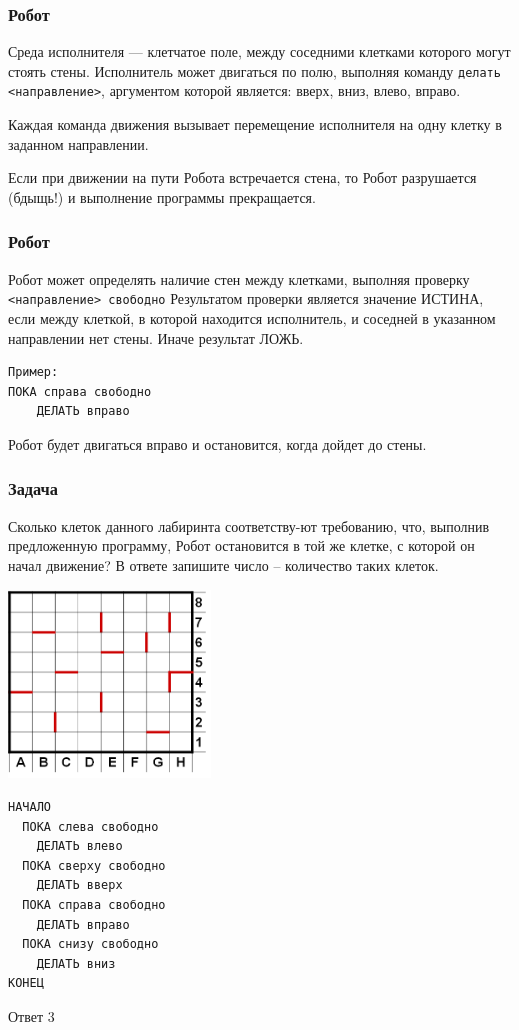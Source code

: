 \begin{frame}[fragile]
\frametitle{Робот}
Среда исполнителя --- клетчатое поле, между соседними клетками которого могут стоять стены.
Исполнитель может двигаться по полю, выполняя команду \texttt{делать <направление>}, аргументом которой  является: вверх, вниз, влево, вправо.

Каждая команда движения вызывает перемещение исполнителя на одну клетку в заданном направлении.

Если при движении на пути Робота встречается стена, то Робот разрушается (бдыщь!) и выполнение программы прекращается.


\end{frame}

\begin{frame}[fragile]
\frametitle{Робот}
Робот может определять наличие стен между клетками, выполняя проверку
\texttt{<направление> свободно}
Результатом проверки является значение ИСТИНА, если между клеткой, в которой находится исполнитель, и соседней в указанном направлении нет стены. Иначе результат ЛОЖЬ.
\begin{verbatim}
Пример:
ПОКА справа свободно
	ДЕЛАТЬ вправо
\end{verbatim}
Робот будет двигаться вправо и остановится, когда дойдет до стены.


\end{frame}

\begin{frame}[fragile]
\frametitle{Задача}
Сколько клеток данного лабиринта соответству-ют требованию, что, выполнив предложенную программу, Робот остановится в той же клетке, с которой он начал движение? В ответе запишите число – количество таких клеток.
\setlength{\columnsep}{2cm}
\begin{multicols}{2}
\includegraphics[height=5cm]{images/it_10}

\columnbreak
\footnotesize
\begin{verbatim}
НАЧАЛО
  ПОКА слева свободно
    ДЕЛАТЬ влево
  ПОКА сверху свободно
    ДЕЛАТЬ вверх
  ПОКА справа свободно
    ДЕЛАТЬ вправо
  ПОКА снизу свободно
    ДЕЛАТЬ вниз
КОНЕЦ
\end{verbatim}
\pause Ответ 3
\end{multicols}
\normalsize
\end{frame}

